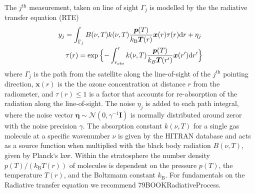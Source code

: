 The $j^\text{th}$ measurement, taken on line of sight $\Gamma_j$  is modelled by the the radiative transfer equation (RTE)~\cite{united2006handbook}
\begin{align}
	y_j =   \int_{\Gamma_j}  B(\nu,T) k(\nu, T)   \frac{\bm{p}(T)}{k_{\text{B}} \bm{T}(r)}  \bm{x}(r)  \tau(r) \text{d}r + \eta_j \, \\
	\tau(r) = \exp{ \Bigl\{ - \int^{r}_{r_\text{obs}}  k(\nu, T)   \frac{\bm{p}(T)}{k_B \bm{T}(r^{\prime})}  \bm{x}(r^{\prime}) \text{d}r^{\prime} \Bigr\} }
	\label{eq:RTE}
\end{align}
where $\Gamma_j$ is the path from the satellite along the line-of-sight of the $j^\text{th}$ pointing direction, $\bm{x}(r)$ is the the ozone concentration at distance $r$ from the radiometer, and $\tau(r)\leq 1$ is a factor that accounts for re-absorption of the radiation  along the line-of-sight. 
The noise $\eta_j$ is added to each path integral, where the noise vector $ \bm{\eta} \sim \mathcal{N}(0, \gamma^{-1} \mathbf{I} )$ is normally distributed around zeror with the noise precision $\gamma$.
The absorption constant $k(\nu, T)$ for a single gas molecule at a specific wavenumber $\nu$ is given by the HITRAN database \cite{gordon2022hitran2020} and acts as a source function when multiplied with the black body radiation $B(\nu,T)$, given by Planck`s law.
Within the stratosphere the number density $p(T) / (k_{\text{B}} T(r))$ of molecules is dependent on the pressure $p(T)$, the temperature $T(r)$, and the Boltzmann constant $k_{\text{B}}$.
For fundamentals on the Radiative transfer equation we recommend 79BOOKRadiativeProcess.

